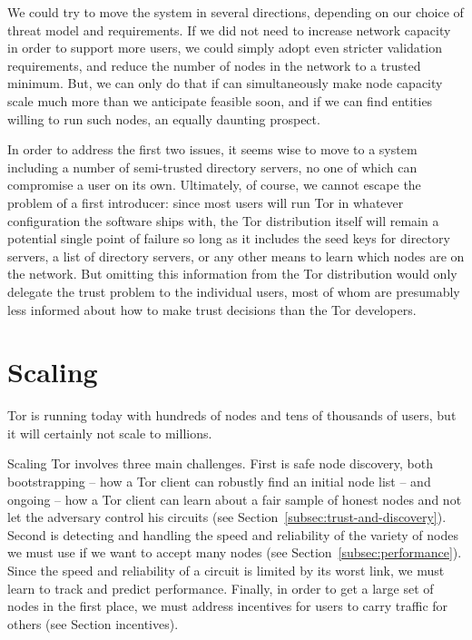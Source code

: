 \documentclass{llncs}
\begin{document}
We could try to move the system in several directions, depending on our
choice of threat model and requirements.  If we did not need to increase
network capacity in order to support more users, we could simply
 adopt even stricter validation requirements, and reduce the number of
nodes in the network to a trusted minimum.  
But, we can only do that if can simultaneously make node capacity
scale much more than we anticipate feasible soon, and if we can find
entities willing to run such nodes, an equally daunting prospect.


In order to address the first two issues, it seems wise to move to a system
including a number of semi-trusted directory servers, no one of which can
compromise a user on its own.  Ultimately, of course, we cannot escape the
problem of a first introducer: since most users will run Tor in whatever
configuration the software ships with, the Tor distribution itself will
remain a potential single point of failure so long as it includes the seed
keys for directory servers, a list of directory servers, or any other means
to learn which nodes are on the network.  But omitting this information
from the Tor distribution would only delegate the trust problem to the
individual users, most of whom are presumably less informed about how to make
trust decisions than the Tor developers.


\section{Scaling}

Tor is running today with hundreds of nodes and tens of thousands of
users, but it will certainly not scale to millions.

Scaling Tor involves three main challenges.  First is safe node
discovery, both bootstrapping -- how a Tor client can robustly find an
initial node list -- and ongoing -- how a Tor client can learn about
a fair sample of honest nodes and not let the adversary control his
circuits (see Section~\ref{subsec:trust-and-discovery}).  Second is detecting and handling the speed
and reliability of the variety of nodes we must use if we want to
accept many nodes (see Section~\ref{subsec:performance}).
Since the speed and reliability of a circuit is limited by its worst link,
we must learn to track and predict performance.  Finally, in order to get
a large set of nodes in the first place, we must address incentives
for users to carry traffic for others (see Section incentives).
\end{document}
